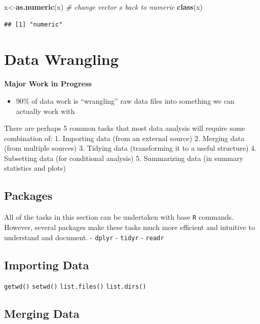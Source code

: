 \documentclass[]{book}
\newenvironment{Shaded}{\begin{snugshade}}{\end{snugshade}}
\newcommand{\KeywordTok}[1]{\textcolor[rgb]{0.13,0.29,0.53}{\textbf{#1}}}
\newcommand{\CommentTok}[1]{\textcolor[rgb]{0.56,0.35,0.01}{\textit{#1}}}
\newcommand{\NormalTok}[1]{#1}
\providecommand{\tightlist}{%
  \setlength{\itemsep}{0pt}\setlength{\parskip}{0pt}}
\theoremstyle{definition}
\theoremstyle{definition}
\theoremstyle{definition}
\theoremstyle{remark}
\begin{document}
\begin{Shaded}
\begin{Highlighting}[]
\NormalTok{x<-}\KeywordTok{as.numeric}\NormalTok{(x) }\CommentTok{# change vector x back to numeric }
\KeywordTok{class}\NormalTok{(x)}
\end{Highlighting}
\end{Shaded}

\begin{verbatim}
## [1] "numeric"
\end{verbatim}

\chapter{Data Wrangling}\label{data-wrangling}

\textbf{Major Work in Progress}

\begin{itemize}
\tightlist
\item
  90\% of data work is ``wrangling'' raw data files into something we
  can actually work with
\end{itemize}

There are perhaps 5 common tasks that most data analysis will require
some combination of: 1. Importing data (from an external source) 2.
Merging data (from multiple sources) 3. Tidying data (transforming it to
a useful structure) 4. Subsetting data (for conditional analysis) 5.
Summarizing data (in summary statistics and plots)

\section{Packages}\label{packages-1}

All of the tasks in this section can be undertaken with base \texttt{R}
commands. However, several packages make these tasks much more efficient
and intuitive to understand and document. - \texttt{dplyr} -
\texttt{tidyr} - \texttt{readr}

\section{Importing Data}\label{importing-data}

\texttt{getwd()} \texttt{setwd()} \texttt{list.files()}
\texttt{list.dirs()}

\section{Merging Data}\label{merging-data}
\end{document}
